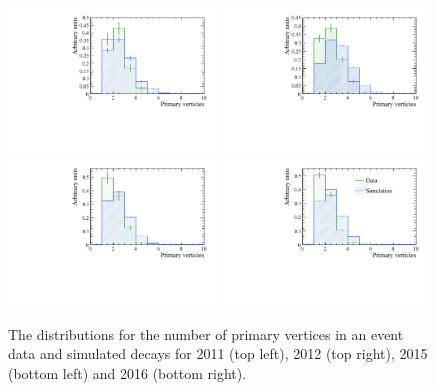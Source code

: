 \begin{figure}[htbp]
  \centering
    \includegraphics[width=0.49\textwidth]{./Figs/LifetimeSystematics/2011_nPVs.pdf}
    \includegraphics[width=0.49\textwidth]{./Figs/LifetimeSystematics/2012_nPVs.pdf}
    \includegraphics[width=0.49\textwidth]{./Figs/LifetimeSystematics/2015_nPVs.pdf}
    \includegraphics[width=0.49\textwidth]{./Figs/LifetimeSystematics/2016_nPVs.pdf}
  \caption{The distributions for the number of primary vertices in an event \bdkpi data and simulated decays for 2011 (top left), 2012 (top right), 2015 (bottom left) and 2016 (bottom right).}
  \label{fig:Bd2KPi_nPVs_MC_data_comparison}
\end{figure}


